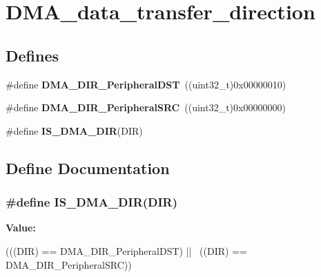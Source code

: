 \hypertarget{group__DMA__data__transfer__direction}{
\section{DMA\_\-data\_\-transfer\_\-direction}
\label{group__DMA__data__transfer__direction}
}
\subsection*{Defines}
\begin{DoxyCompactItemize}
\item 
\hypertarget{group__DMA__data__transfer__direction_ga51567b748ddac277743c65c20275971a}{
\#define {\bfseries DMA\_\-DIR\_\-PeripheralDST}~((uint32\_\-t)0x00000010)}
\label{group__DMA__data__transfer__direction_ga51567b748ddac277743c65c20275971a}

\item 
\hypertarget{group__DMA__data__transfer__direction_ga5ce120a044359410136695a2c05df68e}{
\#define {\bfseries DMA\_\-DIR\_\-PeripheralSRC}~((uint32\_\-t)0x00000000)}
\label{group__DMA__data__transfer__direction_ga5ce120a044359410136695a2c05df68e}

\item 
\#define {\bfseries IS\_\-DMA\_\-DIR}(DIR)
\end{DoxyCompactItemize}


\subsection{Define Documentation}
\hypertarget{group__DMA__data__transfer__direction_gaaad13d2b5808e32a35a2d21bcdbb2296}{
\subsubsection[{IS\_\-DMA\_\-DIR}]{\setlength{\rightskip}{0pt plus 5cm}\#define IS\_\-DMA\_\-DIR(DIR)}}
\label{group__DMA__data__transfer__direction_gaaad13d2b5808e32a35a2d21bcdbb2296}
{\bfseries Value:}
\begin{DoxyCode}
(((DIR) == DMA_DIR_PeripheralDST) || \
                         ((DIR) == DMA_DIR_PeripheralSRC))
\end{DoxyCode}
